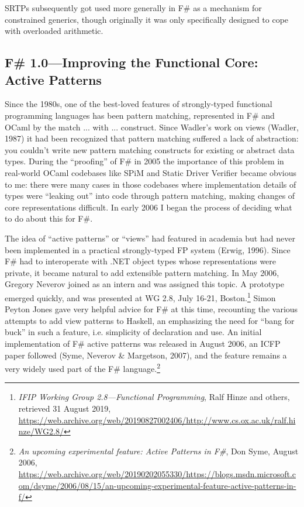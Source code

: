 \documentclass[acmsmall]{acmart}\settopmatter{}
\begin{document}
SRTPs subsequently got used more generally in F\# as a mechanism for constrained generics, though originally it was only specifically designed to cope with overloaded arithmetic.


\subsection*{F\# 1.0---Improving the Functional Core: Active Patterns}

Since the 1980s, one of the best-loved features of strongly-typed functional programming languages has been pattern matching, represented in F\# and OCaml by the match ... with ... construct. Since Wadler’s work on views (Wadler, 1987) it had been recognized that pattern matching suffered a lack of abstraction: you couldn’t write new pattern matching constructs for existing or abstract data types.  During the “proofing” of F\# in 2005 the importance of this problem in real-world OCaml codebases like SPiM and Static Driver Verifier became obvious to me: there were many cases in those codebases where implementation details of types were “leaking out” into code through pattern matching, making changes of core representations difficult.  In early 2006 I began the process of deciding what to do about this for F\#.  

The idea of “active patterns” or “views” had featured in academia but had never been implemented in a practical strongly-typed FP system (Erwig, 1996).  Since F\# had to interoperate with .NET object types whose representations were private, it became natural to add extensible pattern matching. In May 2006, Gregory Neverov joined as an intern and was assigned this topic.  A prototype emerged quickly, and was presented at WG 2.8, July 16-21, Boston.\footnote{\textit{IFIP Working Group 2.8---Functional Programming}, Ralf Hinze and others, retrieved 31 August 2019, \url{https://web.archive.org/web/20190827002406/http://www.cs.ox.ac.uk/ralf.hinze/WG2.8/}}  Simon Peyton Jones gave very helpful advice for F\# at this time, recounting the various attempts to add view patterns to Haskell, an emphasizing the need for “bang for buck” in such a feature, i.e. simplicity of declaration and use. An initial implementation of F\# active patterns was released in August 2006, an ICFP paper followed (Syme, Neverov \& Margetson, 2007), and the feature remains a very widely used part of the F\# language.\footnote{\textit{An upcoming experimental feature: Active Patterns in F\#}, Don Syme, August 2006, \url{https://web.archive.org/web/20190202055330/https://blogs.msdn.microsoft.com/dsyme/2006/08/15/an-upcoming-experimental-feature-active-patterns-in-f/}}
\end{document}
